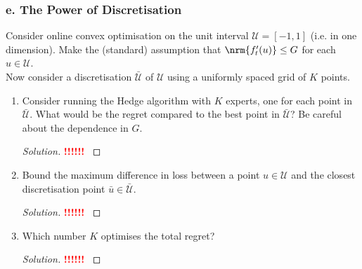 \documentclass[10pt, a4paper, twoside]{amsart}
\theoremstyle{plain}
\DeclarePairedDelimiter{\nrm}\lVert\rVert
\newcommand{\cU}{\ensuremath{\mathcal{U}}}
\newenvironment{solution}
               {\let\oldqedsymbol=\qedsymbol
                \renewcommand{\qedsymbol}{$\blacktriangleleft$}
                \begin{proof}[Solution]}
               {\end{proof}
                \renewcommand{\qedsymbol}{\oldqedsymbol}}
\newcommand{\TODO}{\textcolor{red}{\textbf{!!!!!! }}}
\begin{document}
\subsubsection*{e. The Power of Discretisation} Consider online convex optimisation on the unit interval $\cU = [-1,1]$ (i.e. in one dimension). Make the (standard) assumption that $\nrm{f'_t(u)} \leq G$ for each $u \in \cU$.\\
Now consider a discretisation $\bar{\cU}$ of $\cU$ using a uniformly spaced grid of $K$ points.
\begin{enumerate}[i]
\item Consider running the Hedge algorithm with $K$ experts, one for each point in $\bar{\cU}$. What would be the regret compared to the best point in $\bar{\cU}$? Be careful about the dependence in $G$.
\begin{solution}
  \TODO
\end{solution}
\item Bound the maximum difference in loss between a point $u \in \cU$ and the closest discretisation point $\bar{u} \in \bar{\cU}$.
\begin{solution}
  \TODO
\end{solution}
\item Which number $K$ optimises the total regret?
\begin{solution}
  \TODO
\end{solution}
\end{enumerate}  
\end{document}
